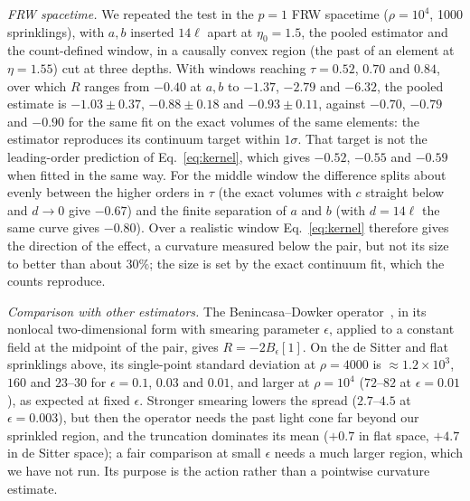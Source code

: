 \documentclass[prd,twocolumn,superscriptaddress,nofootinbib,amsmath,amssymb,floatfix]{revtex4-2}
\begin{document}
\emph{FRW spacetime.} We repeated the test in the $p=1$ FRW spacetime ($\rho=10^4$, 1000 sprinklings), with $a,b$ inserted $14\ell$ apart at $\eta_0=1.5$, the pooled estimator and the count-defined window, in a causally convex region (the past of an element at $\eta=1.55$) cut at three depths. With windows reaching $\tau=0.52$, $0.70$ and $0.84$, over which $R$ ranges from $-0.40$ at $a,b$ to $-1.37$, $-2.79$ and $-6.32$, the pooled estimate is $-1.03\pm0.37$, $-0.88\pm0.18$ and $-0.93\pm0.11$, against $-0.70$, $-0.79$ and $-0.90$ for the same fit on the exact volumes of the same elements: the estimator reproduces its continuum target within $1\sigma$. That target is not the leading-order prediction of Eq.~\eqref{eq:kernel}, which gives $-0.52$, $-0.55$ and $-0.59$ when fitted in the same way. For the middle window the difference splits about evenly between the higher orders in $\tau$ (the exact volumes with $c$ straight below and $d\to0$ give $-0.67$) and the finite separation of $a$ and $b$ (with $d=14\ell$ the same curve gives $-0.80$). Over a realistic window Eq.~\eqref{eq:kernel} therefore gives the direction of the effect, a curvature measured below the pair, but not its size to better than about $30\%$; the size is set by the exact continuum fit, which the counts reproduce.

\emph{Comparison with other estimators.} The Benincasa--Dowker operator~\cite{BD10}, in its nonlocal two-dimensional form with smearing parameter $\epsilon$, applied to a constant field at the midpoint of the pair, gives $R=-2B_\epsilon[1]$. On the de Sitter and flat sprinklings above, its single-point standard deviation at $\rho=4000$ is $\approx1.2\times10^3$, $160$ and $23$--$30$ for $\epsilon=0.1$, $0.03$ and $0.01$, and larger at $\rho=10^4$ ($72$--$82$ at $\epsilon=0.01$), as expected at fixed $\epsilon$. Stronger smearing lowers the spread ($2.7$--$4.5$ at $\epsilon=0.003$), but then the operator needs the past light cone far beyond our sprinkled region, and the truncation dominates its mean ($+0.7$ in flat space, $+4.7$ in de Sitter space); a fair comparison at small $\epsilon$ needs a much larger region, which we have not run. Its purpose is the action rather than a pointwise curvature estimate.
\end{document}
